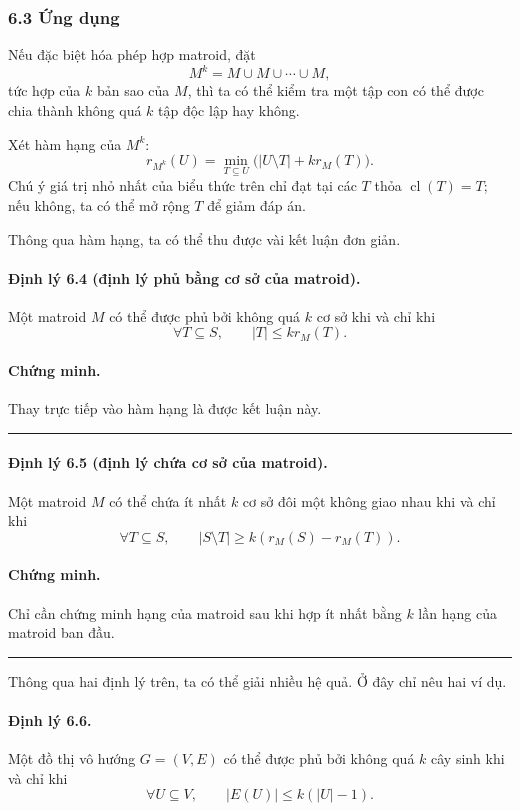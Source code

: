 \documentclass[11pt]{article}
\newcommand{\qedmark}{\hfill\rule{0.7ex}{0.7ex}}
\begin{document}
\subsubsection*{6.3 Ứng dụng}

Nếu đặc biệt hóa phép hợp matroid, đặt
\[
  M^k=M\cup M\cup\cdots\cup M,
\]
tức hợp của \(k\) bản sao của \(M\), thì ta có thể kiểm tra một tập con có thể
được chia thành không quá \(k\) tập độc lập hay không.

Xét hàm hạng của \(M^k\):
\[
  r_{M^k}(U)=\min_{T\subseteq U}\bigl(|U\setminus T|+k r_M(T)\bigr).
\]
Chú ý giá trị nhỏ nhất của biểu thức trên chỉ đạt tại các \(T\) thỏa
\(\operatorname{cl}(T)=T\); nếu không, ta có thể mở rộng \(T\) để giảm đáp án.

Thông qua hàm hạng, ta có thể thu được vài kết luận đơn giản.

\paragraph{Định lý 6.4 (định lý phủ bằng cơ sở của matroid).}
Một matroid \(M\) có thể được phủ bởi không quá \(k\) cơ sở khi và chỉ khi
\[
  \forall T\subseteq S,\qquad |T|\le k r_M(T).
\]

\paragraph{Chứng minh.}
Thay trực tiếp vào hàm hạng là được kết luận này. \qedmark

\paragraph{Định lý 6.5 (định lý chứa cơ sở của matroid).}
Một matroid \(M\) có thể chứa ít nhất \(k\) cơ sở đôi một không giao nhau khi và
chỉ khi
\[
  \forall T\subseteq S,\qquad |S\setminus T|\ge k(r_M(S)-r_M(T)).
\]

\paragraph{Chứng minh.}
Chỉ cần chứng minh hạng của matroid sau khi hợp ít nhất bằng \(k\) lần hạng của
matroid ban đầu. \qedmark

Thông qua hai định lý trên, ta có thể giải nhiều hệ quả. Ở đây chỉ nêu hai ví
dụ.

\paragraph{Định lý 6.6.}
Một đồ thị vô hướng \(G=(V,E)\) có thể được phủ bởi không quá \(k\) cây sinh khi
và chỉ khi
\[
  \forall U\subseteq V,\qquad |E(U)|\le k(|U|-1).
\]
\end{document}
